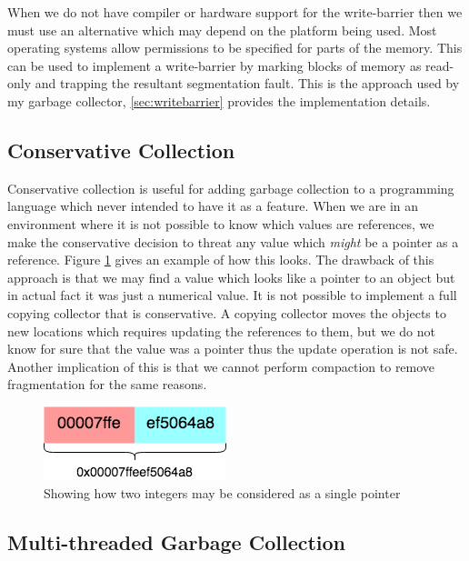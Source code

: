 \documentclass[../diss.tex]{subfiles}
\begin{document}
When we do not have compiler or hardware support for the write-barrier then we must use an alternative which may depend on the platform being used. Most operating systems allow permissions to be specified for parts of the memory. This can be used to implement a write-barrier by marking blocks of memory as read-only and trapping the resultant segmentation fault. This is the approach used by my garbage collector, \cref{sec:writebarrier} provides the implementation details.

\subsection{Conservative Collection} \label{lab:conservative}

Conservative collection is useful for adding garbage collection to a programming language which never intended to have it as a feature. When we are in an environment where it is not possible to know which values are references, we make the conservative decision to threat any value which \emph{might} be a pointer as a reference. Figure \ref{fig:conservative} gives an example of how this looks. The drawback of this approach is that we may find a value which looks like a pointer to an object but in actual fact it was just a numerical value. It is not possible to implement a full copying collector that is conservative. A copying collector moves the objects to new locations which requires updating the references to them, but we do not know for sure that the value was a pointer thus the update operation is not safe. Another implication of this is that we cannot perform compaction to remove fragmentation for the same reasons.

\begin{figure}
    \centering
    \includegraphics{figs/conservative.png}
    \caption{Showing how two integers may be considered as a single pointer}
    \label{fig:conservative}
\end{figure}

\subsection{Multi-threaded Garbage Collection} \label{sec:multithreadingmodels}
\end{document}
